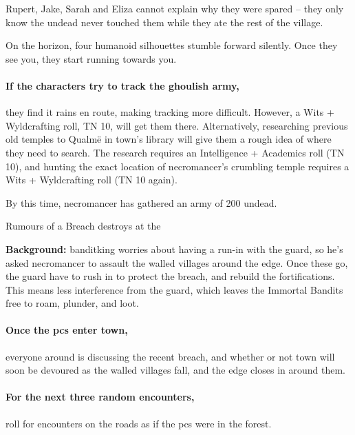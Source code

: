 Rupert, Jake, Sarah and Eliza cannot explain why they were spared -- they only know the undead never touched them while they ate the rest of the \gls{village}.

\begin{boxtext}

  On the horizon, four humanoid silhouettes stumble forward silently.  Once they see you, they start running towards you.

\end{boxtext}

\paragraph{If the characters try to track the ghoulish army,}
they find it rains en route, making tracking more difficult.
However, a Wits + Wyldcrafting roll, TN 10, will get them there.
Alternatively, researching previous old temples to Qualm\"{e} in \gls{town}'s library will give them a rough idea of where they need to search.
The research requires an Intelligence + Academics roll (TN 10), and hunting the exact location of \gls{necromancer}'s crumbling temple requires a Wits + Wyldcrafting roll (TN 10 again).

By this time, \gls{necromancer} has gathered an army of 200 undead.

{\squash Rumours of a Breach}%
{ destroys  at the }%

\textbf{Background:}
\Gls{banditking} worries about having a run-in with the \gls{guard}, so he's asked \gls{necromancer} to assault the walled \glspl{village} around the \gls{edge}.
Once these go, the \gls{guard} have to rush in to protect the breach, and rebuild the fortifications.
This means less interference from the \gls{guard}, which leaves the Immortal Bandits free to roam, plunder, and loot.

\paragraph{Once the \glspl{pc} enter \gls{town},}
everyone around is discussing the recent breach, and whether or not \gls{town} will soon be devoured as the walled \glspl{village} fall, and the \gls{edge} closes in around them.

\paragraph{For the next three random encounters,}
roll for encounters on the roads as if the \glspl{pc} were in the forest.

